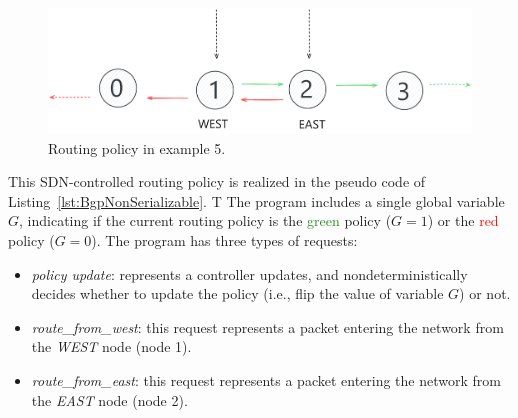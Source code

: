 


\begin{figure}[H]
	\centering
	\includegraphics[width=0.8\linewidth]{plots/east_west_routing.pdf}
	\caption{Routing policy in example 5.}
	\label{fig:BgpRoutingPolicies}
\end{figure}

This SDN-controlled routing policy is realized in the pseudo code of Listing~\ref{lst:BgpNonSerializable}. T
%
The program includes a single global variable $G$, indicating if the current routing policy is the  \textcolor{ForestGreen}{green} policy ($G=1$) or the \textcolor{red}{red} policy ($G=0$).
%
The program has three types of requests:
\begin{itemize}
	
	\item 
	\textit{policy update}: represents a controller updates, and nondeterministically decides whether to update the policy (i.e., flip the value of  variable $G$) or not.
	
	\item 
	\textit{route\_from\_west}: this request represents a packet entering the network from the \textit{WEST} node (node 1).
	
	\item 
	\textit{route\_from\_east}: this request represents a packet entering the network from the \textit{EAST} node (node 2).
	
\end{itemize}


